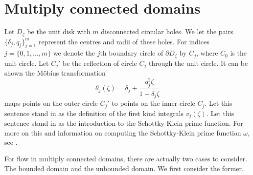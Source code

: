 \documentclass[12pt,fleqn]{article}
\newcommand{\conj}[1]{\overline{#1}}
\begin{document}
\section{Multiply connected domains}
Let $D_\zeta$ be the unit disk with $m$ disconnected circular holes. We let the pairs $\{\delta_j,q_j\}_{j=1}^m$ represent the centres and radii of these holes. For indices $j=\{0,1,\dots,m\}$ we denote the $j$th boundary circle of $\partial D_\zeta$ by $C_j$, where $C_0$ is the unit circle.
Let $C_j'$ be the reflection of circle $C_j$ through the unit circle. It can be shown the M\"obius transformation
\begin{equation*}
  \theta_j(\zeta) = \delta_j + \frac{q_j^2 \zeta}{1 - \conj{\delta_j}\zeta}
\end{equation*}
maps points on the outer circle $C_j'$ to points on the inner circle $C_j$.
Let this sentence stand in as the definition of the first kind integrals $v_j(\zeta)$. Let this sentence stand in as the introduction to the Schottky-Klein prime function.
For more on this and information on computing the Schottky-Klein prime function $\omega$, see \cite{primecalc}.

For flow in multiply connected domains, there are actually two cases to consider. The bounded domain and the unbounded domain. We first consider the former.
\end{document}
